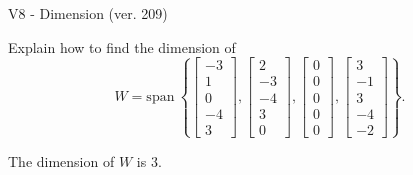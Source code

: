 \begin{exercise}
  \begin{exerciseTitle}V8 - Dimension (ver. 209)\end{exerciseTitle}
  \begin{exerciseStatement}
    Explain how to find the dimension of 
\[W=\mathrm{span}\ \left\{\left[\begin{array}{r}
-3 \\
1 \\
0 \\
-4 \\
3
\end{array}\right] , \left[\begin{array}{r}
2 \\
-3 \\
-4 \\
3 \\
0
\end{array}\right] , \left[\begin{array}{r}
0 \\
0 \\
0 \\
0 \\
0
\end{array}\right] , \left[\begin{array}{r}
3 \\
-1 \\
3 \\
-4 \\
-2
\end{array}\right]\right\}.\]



  \end{exerciseStatement}
  \begin{exerciseAnswer}
   The dimension of \(W\) is  \(3\).
  


  \end{exerciseAnswer}
\end{exercise}